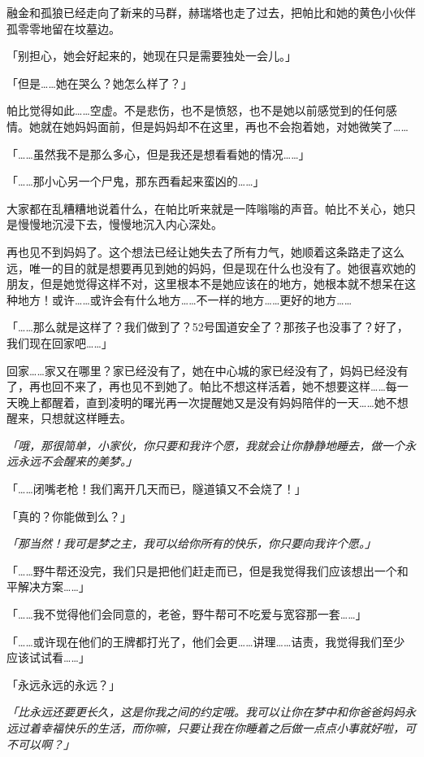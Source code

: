 \horizonline


融金和孤狼已经走向了新来的马群，赫瑞塔也走了过去，把帕比和她的黄色小伙伴孤零零地留在坟墓边。

「别担心，她会好起来的，她现在只是需要独处一会儿。」

「但是……她在哭么？她怎么样了？」

帕比觉得如此……空虚。不是悲伤，也不是愤怒，也不是她以前感觉到的任何感情。她就在她妈妈面前，但是妈妈却不在这里，再也不会抱着她，对她微笑了……{}

「……虽然我不是那么多心，但是我还是想看看她的情况……」

「……那小心另一个尸鬼，那东西看起来蛮凶的……」

大家都在乱糟糟地说着什么，在帕比听来就是一阵嗡嗡的声音。帕比不关心，她只是慢慢地沉浸下去，慢慢地沉入内心深处。

再也见不到妈妈了。这个想法已经让她失去了所有力气，她顺着这条路走了这么远，唯一的目的就是想要再见到她的妈妈，但是现在什么也没有了。她很喜欢她的朋友，但是她觉得这样不对，这里根本不是她应该在的地方，她根本就不想呆在这种地方！或许……或许会有什么地方……不一样的地方……更好的地方……{}

「……那么就是这样了？我们做到了？52号国道安全了？那孩子也没事了？好了，我们现在回家吧……」

回家……家又在哪里？家已经没有了，她在中心城的家已经没有了，妈妈已经没有了，再也回不来了，再也见不到她了。帕比不想这样活着，她不想要这样……每一天晚上都醒着，直到凌明的曙光再一次提醒她又是没有妈妈陪伴的一天……她不想醒来，只想就这样睡去。

\emph{「哦，那很简单，小家伙，你只要和我许个愿，我就会让你静静地睡去，做一个永远永远不会醒来的美梦。」}

「……闭嘴老枪！我们离开几天而已，隧道镇又不会烧了！」

「真的？你能做到么？」

\emph{「那当然！我可是梦之主，我可以给你所有的快乐，你只要向我许个愿。」}

「……野牛帮还没完，我们只是把他们赶走而已，但是我觉得我们应该想出一个和平解决方案……」

「……我不觉得他们会同意的，老爸，野牛帮可不吃爱与宽容那一套……」

「……或许现在他们的王牌都打光了，他们会更……讲理……诘责，我觉得我们至少应该试试看……」

「永远永远的永远？」

\emph{「比永远还要更长久，这是你我之间的约定哦。我可以让你在梦中和你爸爸妈妈永远过着幸福快乐的生活，而你嘛，只要让我在你睡着之后做一点点小事就好啦，可不可以啊？」}

